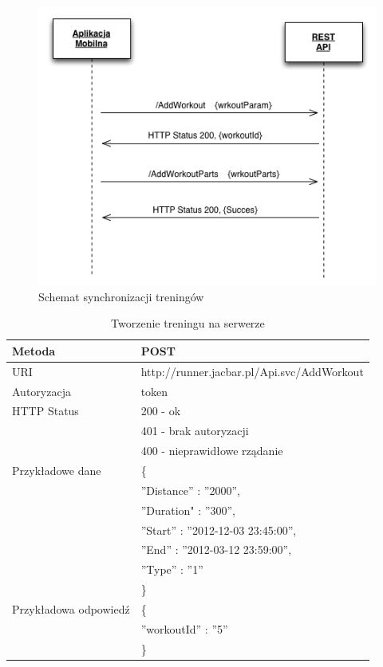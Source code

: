 \begin{figure}[ht]
	\centering
		\includegraphics[width=1\linewidth]{assets/workout_parts.png}
		\caption{Schemat synchronizacji treningów}
	\label{fig:workout_parts}
\end{figure}

\begin{table}
 \label{workout}
  \caption{Tworzenie treningu na serwerze}
  \begin{center}
  \begin{tabular}{| l | l |}
  	\hline
  	Metoda & POST \\ \hline
  	URI & http://runner.jacbar.pl/Api.svc/AddWorkout \\ \hline
  	Autoryzacja & token \\ \hline
  	HTTP Status & 200 - ok \\
                & 401 - brak autoryzacji \\
                & 400 - nieprawidłowe rządanie \\ \hline
    Przykładowe dane & \{ \\
    								 & \quad ''Distance'' : ''2000'', \\
    								 & \quad ''Duration" : ''300'', \\
    								 & \quad ''Start'' : ''2012-12-03 23:45:00'', \\
    								 & \quad ''End'' : ''2012-03-12 23:59:00'', \\
    								 & \quad ''Type'' : ''1'' \\ 
    								 & \} \\ \hline
    Przykładowa odpowiedź & \{ \\
                          & \quad ''workoutId'' : ''5'' \\
                          & \} \\ \hline
  \end{tabular}
  \end{center}
\end{table}


